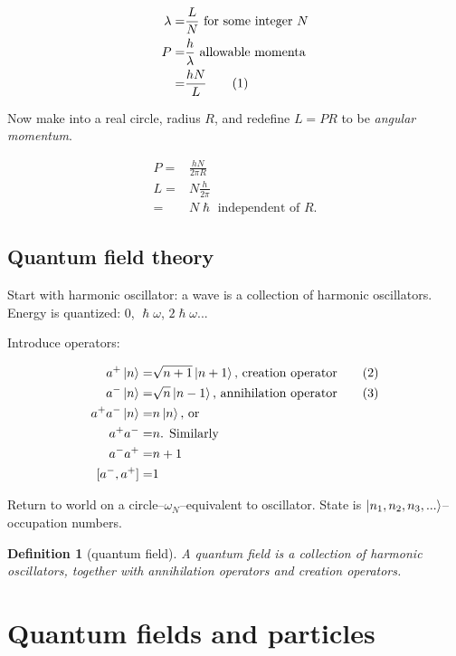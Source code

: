 \documentclass[]{article}
\newcommand\numberthis{\addtocounter{equation}{1}\tag{\theequation}}
\newtheorem{defn}[thm]{Definition}
\begin{document}
\begin{align*}
	\lambda =& \frac{L}{N} \text{ for some integer $N$}\\
	P =& \frac{h}{\lambda} \text{ allowable momenta}\\
	=& \frac{h N}{L} \numberthis \label{eq:momenta:finit:volume}
\end{align*}

Now make into a real circle, radius $R$, and redefine $L=PR$ to be \emph{angular momentum}.

\begin{align*}
	P =& \frac{h N}{2 \pi R}\\
	L =& N \frac{h}{2 \pi}\\
	=& N \hslash \text{ independent of $R$.}
\end{align*}

\subsection{Quantum field theory}

Start with harmonic oscillator: a wave is a collection of harmonic oscillators. Energy is quantized: 0, $\hslash \omega$, $2\hslash \omega$...

Introduce operators:

\begin{align*}
	a^+ \ket{n} =& \sqrt{n+1} \ket{n+1} \text{, creation operator} \numberthis \label{eq:creation}\\
	a^- \ket{n} =& \sqrt{n} \ket{n-1} \text{, annihilation operator} \numberthis \label{eq:annihilation} \\
	a^+ a^- \ket{n} =& n \ket{n} \text{, or}\\
	a^+ a^-  =& n \text{. Similarly}\\
	a^- a^+  =& n+1\\
	[a^-, a^+] =& 1
\end{align*}

Return to world on a circle--$\omega_N$--equivalent to oscillator. State is $\ket{n_1,n_2, n_3,...}$--occupation numbers. 
\begin{defn}[quantum field]
	A quantum field is a collection of harmonic oscillators, together with annihilation operators and creation operators.
\end{defn}

\section{Quantum fields and particles}
\end{document}
